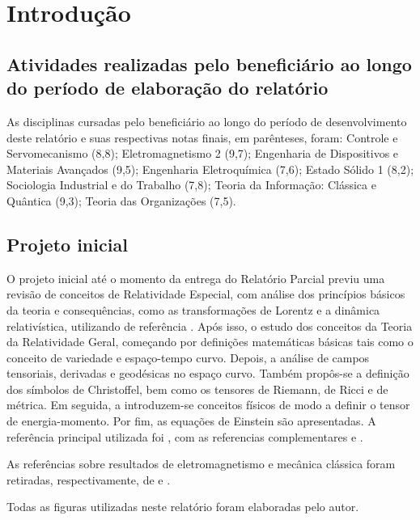 \chapter*{Introdução}
\section*{Atividades realizadas pelo beneficiário ao longo do período de elaboração do relatório}

As disciplinas cursadas pelo beneficiário ao longo do período de desenvolvimento deste relatório e suas respectivas notas finais, em parênteses, foram: Controle e Servomecanismo (8,8); Eletromagnetismo 2 (9,7); Engenharia de Dispositivos e Materiais Avançados (9,5); Engenharia Eletroquímica (7,6); Estado Sólido 1 (8,2); Sociologia Industrial e do Trabalho (7,8); Teoria da Informação: Clássica e Quântica (9,3); Teoria das Organizações (7,5).


\section*{Projeto inicial}
O projeto inicial até o momento da entrega do Relatório Parcial previu uma revisão de conceitos de Relatividade Especial, com análise dos princípios básicos da teoria e consequências, como as transformações de Lorentz e a dinâmica relativística, utilizando de referência \cite{Dray2012}.
Após isso, o estudo dos conceitos da Teoria da Relatividade Geral, começando por definições matemáticas básicas tais como o conceito de variedade e espaço-tempo curvo. Depois, a análise de campos tensoriais, derivadas e geodésicas no espaço curvo. Também propôs-se a definição dos símbolos de Christoffel, bem como os tensores de Riemann, de Ricci e de métrica. Em seguida, a introduzem-se conceitos físicos de modo a definir o tensor de energia-momento. Por fim, as equações de Einstein são apresentadas.  A referência principal utilizada foi \cite{Foster2006}, com as referencias complementares \cite{Hartle2005} e \cite{Schutz2009}. 

As referências sobre resultados de eletromagnetismo e mecânica clássica foram retiradas, respectivamente, de \cite{Griffiths2005} e \cite{nussenzveig2013curso}.

Todas as figuras utilizadas neste relatório foram elaboradas pelo autor.